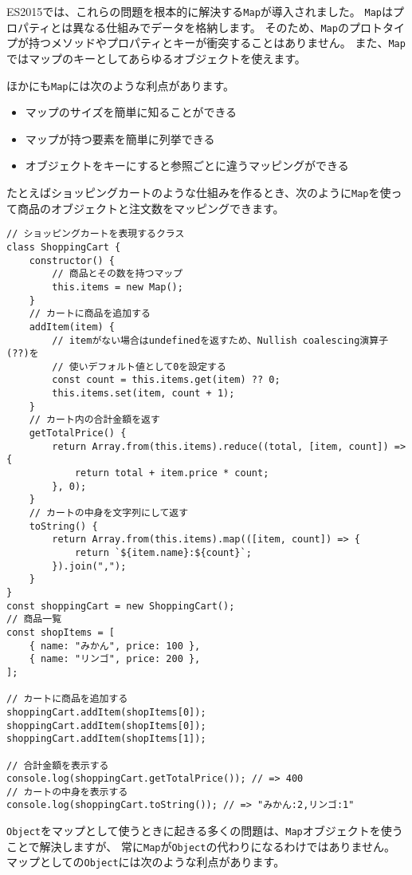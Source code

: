 ES2015では、これらの問題を根本的に解決する\texttt{Map}が導入されました。
\texttt{Map}はプロパティとは異なる仕組みでデータを格納します。
そのため、\texttt{Map}のプロトタイプが持つメソッドやプロパティとキーが衝突することはありません。
また、\texttt{Map}ではマップのキーとしてあらゆるオブジェクトを使えます。

ほかにも\texttt{Map}には次のような利点があります。

\begin{itemize}
\item
  マップのサイズを簡単に知ることができる
\item
  マップが持つ要素を簡単に列挙できる
\item
  オブジェクトをキーにすると参照ごとに違うマッピングができる
\end{itemize}

たとえばショッピングカートのような仕組みを作るとき、次のように\texttt{Map}を使って商品のオブジェクトと注文数をマッピングできます。

\begin{lstlisting}
// ショッピングカートを表現するクラス
class ShoppingCart {
    constructor() {
        // 商品とその数を持つマップ
        this.items = new Map();
    }
    // カートに商品を追加する
    addItem(item) {
        // itemがない場合はundefinedを返すため、Nullish coalescing演算子(??)を
        // 使いデフォルト値として0を設定する
        const count = this.items.get(item) ?? 0;
        this.items.set(item, count + 1);
    }
    // カート内の合計金額を返す
    getTotalPrice() {
        return Array.from(this.items).reduce((total, [item, count]) => {
            return total + item.price * count;
        }, 0);
    }
    // カートの中身を文字列にして返す
    toString() {
        return Array.from(this.items).map(([item, count]) => {
            return `${item.name}:${count}`;
        }).join(",");
    }
}
const shoppingCart = new ShoppingCart();
// 商品一覧
const shopItems = [
    { name: "みかん", price: 100 },
    { name: "リンゴ", price: 200 },
];

// カートに商品を追加する
shoppingCart.addItem(shopItems[0]);
shoppingCart.addItem(shopItems[0]);
shoppingCart.addItem(shopItems[1]);

// 合計金額を表示する
console.log(shoppingCart.getTotalPrice()); // => 400
// カートの中身を表示する
console.log(shoppingCart.toString()); // => "みかん:2,リンゴ:1"
\end{lstlisting}

\texttt{Object}をマップとして使うときに起きる多くの問題は、\texttt{Map}オブジェクトを使うことで解決しますが、
常に\texttt{Map}が\texttt{Object}の代わりになるわけではありません。
マップとしての\texttt{Object}には次のような利点があります。


